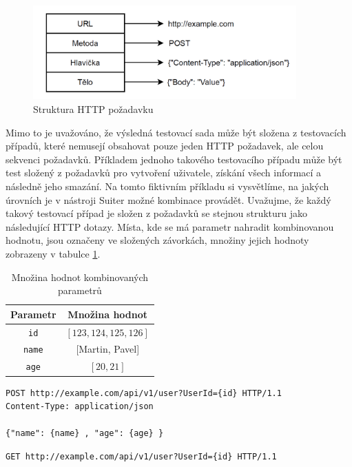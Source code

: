 \begin{figure}[hbt!]
	\centering
	\includegraphics[width=0.9\textwidth]{obrazky-figures/HTTPstructure2.png}
	\caption{Struktura HTTP požadavku}
	\label{fig_StrukturaHTTPPozadavku}
\end{figure}

Mimo to je uvažováno, že výsledná testovací sada může být složena z testovacích případů, které nemusejí obsahovat pouze jeden HTTP požadavek, ale celou sekvenci požadavků. Příkladem jednoho takového testovacího případu může být test složený z požadavků pro vytvoření uživatele, získání všech informací a následně jeho smazání. Na tomto fiktivním příkladu si vysvětlíme, na jakých úrovních je v nástroji Suiter možné kombinace provádět. Uvažujme, že každý takový testovací případ je složen z požadavků se stejnou strukturu jako následující HTTP dotazy. Místa, kde se má parametr nahradit kombinovanou hodnotu, jsou označeny ve složených závorkách, množiny jejich hodnoty zobrazeny v tabulce \ref{table_MnozinaHodnot}.

\begin{table}[h]
\centering
\begin{tabular}{ |c||c| } 
 \hline
Parametr & Množina hodnot \\ 
 \hline
 \hline
\texttt{id} & $[123,124,125,126]$ \\
 \hline
\texttt{name} & [Martin, Pavel] \\ 
 \hline
\texttt{age} & $[20,21]$ \\
 \hline
\end{tabular}
\caption{Množina hodnot kombinovaných parametrů}
\label{table_MnozinaHodnot}
\end{table}

\begin{lstlisting}[frame=single]
POST http://example.com/api/v1/user?UserId={id} HTTP/1.1
Content-Type: application/json

{"name": {name} , "age": {age} }
\end{lstlisting}

\begin{lstlisting}[frame=single]
GET http://example.com/api/v1/user?UserId={id} HTTP/1.1

\end{lstlisting}

